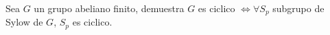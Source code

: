 \question
Sea $G$ un grupo abeliano finito, demuestra
$G$ es ciclico $\iff \forall S_p$ subgrupo de Sylow de $G$, $S_p$ es ciclico.